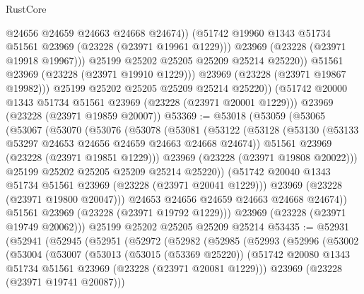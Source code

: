 \begin{lexlean}{RustCore}
\begin{coremodule}
                      @24656
                      @24659
                      @24663
                      @24668
                      @24674))
                  (@51742 @19960 @1343 @51734 @51561 @23969 (@23228 (@23971 @19961 @1229)))
                  @23969
                  (@23228 (@23971 @19918 @19967)))
                @25199
                @25202
                @25205
                @25209
                @25214
                @25220))
            @51561
            @23969
            (@23228 (@23971 @19910 @1229)))
          @23969
          (@23228 (@23971 @19867 @19982)))
        @25199
        @25202
        @25205
        @25209
        @25214
        @25220))
    (@51742 @20000 @1343 @51734 @51561 @23969 (@23228 (@23971 @20001 @1229)))
    @23969
    (@23228 (@23971 @19859 @20007))
@53369 := @53018
    (@53059
      (@53065
        (@53067
          (@53070
            (@53076
              (@53078
                (@53081
                  (@53122
                    (@53128
                      (@53130 (@53133 @53297 @24653 @24656 @24659 @24663 @24668 @24674))
                      @51561
                      @23969
                      (@23228 (@23971 @19851 @1229)))
                    @23969
                    (@23228 (@23971 @19808 @20022)))
                  @25199
                  @25202
                  @25205
                  @25209
                  @25214
                  @25220))
              (@51742 @20040 @1343 @51734 @51561 @23969 (@23228 (@23971 @20041 @1229)))
              @23969
              (@23228 (@23971 @19800 @20047)))
            @24653
            @24656
            @24659
            @24663
            @24668
            @24674))
        @51561
        @23969
        (@23228 (@23971 @19792 @1229)))
      @23969
      (@23228 (@23971 @19749 @20062)))
    @25199
    @25202
    @25205
    @25209
    @25214
@53435 := @52931
    (@52941
      (@52945
        (@52951
          (@52972
            (@52982
              (@52985
                (@52993
                  (@52996
                    (@53002
                      (@53004
                        (@53007
                          (@53013
                            (@53015 (@53369 @25220))
                            (@51742
                              @20080
                              @1343
                              @51734
                              @51561
                              @23969
                              (@23228 (@23971 @20081 @1229)))
                            @23969
                            (@23228 (@23971 @19741 @20087)))

\end{coremodule}
\end{lexlean}
